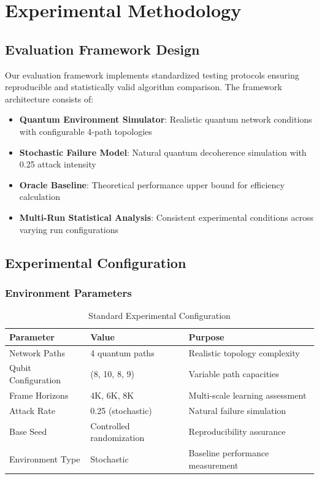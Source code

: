 \documentclass[12pt,a4paper]{article}
\begin{document}
\section{Experimental Methodology}

\subsection{Evaluation Framework Design}

Our evaluation framework implements standardized testing protocols ensuring reproducible and statistically valid algorithm comparison. The framework architecture consists of:

\begin{itemize}
\item \textbf{Quantum Environment Simulator}: Realistic quantum network conditions with configurable 4-path topologies
\item \textbf{Stochastic Failure Model}: Natural quantum decoherence simulation with 0.25 attack intensity
\item \textbf{Oracle Baseline}: Theoretical performance upper bound for efficiency calculation
\item \textbf{Multi-Run Statistical Analysis}: Consistent experimental conditions across varying run configurations
\end{itemize}

\subsection{Experimental Configuration}

\subsubsection{Environment Parameters}
\begin{table}[H]
\centering
\caption{Standard Experimental Configuration}
\begin{tabular}{|l|l|l|}
\hline
\textbf{Parameter} & \textbf{Value} & \textbf{Purpose} \\
\hline
\hline
Network Paths & 4 quantum paths & Realistic topology complexity \\
Qubit Configuration & (8, 10, 8, 9) & Variable path capacities \\
Frame Horizons & 4K, 6K, 8K & Multi-scale learning assessment \\
Attack Rate & 0.25 (stochastic) & Natural failure simulation \\
Base Seed & Controlled randomization & Reproducibility assurance \\
Environment Type & Stochastic & Baseline performance measurement \\
\hline
\end{tabular}
\end{table}
\end{document}
